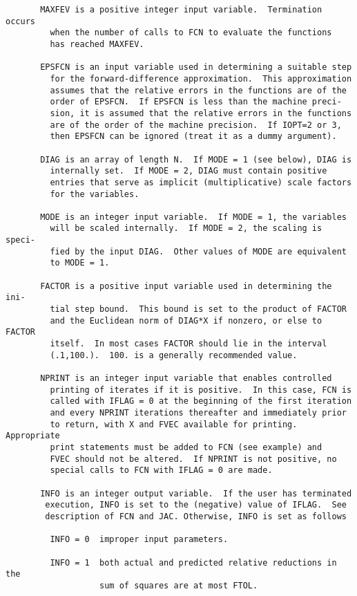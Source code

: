 \begin{verbatim}
       MAXFEV is a positive integer input variable.  Termination occurs
         when the number of calls to FCN to evaluate the functions
         has reached MAXFEV.

       EPSFCN is an input variable used in determining a suitable step
         for the forward-difference approximation.  This approximation
         assumes that the relative errors in the functions are of the
         order of EPSFCN.  If EPSFCN is less than the machine preci-
         sion, it is assumed that the relative errors in the functions
         are of the order of the machine precision.  If IOPT=2 or 3,
         then EPSFCN can be ignored (treat it as a dummy argument).

       DIAG is an array of length N.  If MODE = 1 (see below), DIAG is
         internally set.  If MODE = 2, DIAG must contain positive
         entries that serve as implicit (multiplicative) scale factors
         for the variables.

       MODE is an integer input variable.  If MODE = 1, the variables
         will be scaled internally.  If MODE = 2, the scaling is speci-
         fied by the input DIAG.  Other values of MODE are equivalent
         to MODE = 1.

       FACTOR is a positive input variable used in determining the ini-
         tial step bound.  This bound is set to the product of FACTOR
         and the Euclidean norm of DIAG*X if nonzero, or else to FACTOR
         itself.  In most cases FACTOR should lie in the interval
         (.1,100.).  100. is a generally recommended value.

       NPRINT is an integer input variable that enables controlled
         printing of iterates if it is positive.  In this case, FCN is
         called with IFLAG = 0 at the beginning of the first iteration
         and every NPRINT iterations thereafter and immediately prior
         to return, with X and FVEC available for printing. Appropriate
         print statements must be added to FCN (see example) and
         FVEC should not be altered.  If NPRINT is not positive, no
         special calls to FCN with IFLAG = 0 are made.

       INFO is an integer output variable.  If the user has terminated
        execution, INFO is set to the (negative) value of IFLAG.  See
        description of FCN and JAC. Otherwise, INFO is set as follows

         INFO = 0  improper input parameters.

         INFO = 1  both actual and predicted relative reductions in the
                   sum of squares are at most FTOL.


\end{verbatim}
